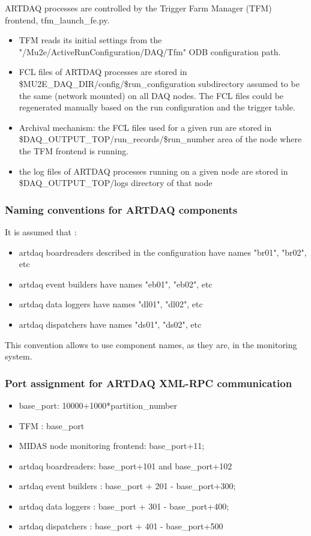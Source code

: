 ARTDAQ processes are controlled by the Trigger Farm Manager (TFM) frontend,
tfm\_launch\_fe.py.

\begin{itemize}
\item 
  TFM reads its initial settings from the "/Mu2e/ActiveRunConfiguration/DAQ/Tfm"
  ODB configuration path.
\item
  FCL files of ARTDAQ processes are stored in \$MU2E\_DAQ\_DIR/config/\$run\_configuration
  subdirectory assumed to be the same (network mounted) on all DAQ nodes.
  The FCL files could be regenerated manually based on the run configuration and the trigger table.
\item
  Archival mechanism: the FCL files used for a given run are stored
  in \$DAQ\_OUTPUT\_TOP/run\_records/\$run\_number area of the node where the TFM frontend is running.
\item
  the log files of ARTDAQ processes running on a given node are stored in \$DAQ\_OUTPUT\_TOP/logs
  directory of that node
\end{itemize}

\subsubsection{Naming conventions for ARTDAQ components}

It is assumed that :
\begin{itemize}
\item 
  artdaq boardreaders described in the configuration have names "br01", "br02", etc
\item 
  artdaq event builders have names "eb01", "eb02", etc
\item 
  artdaq data loggers have names "dl01", "dl02", etc
\item 
  artdaq dispatchers have names "ds01", "ds02", etc
\end{itemize}

This convention allows to use component names, as they are, in the monitoring system.

\subsubsection{Port assignment for ARTDAQ XML-RPC communication}
\begin{itemize}
\item
  base\_port: 10000+1000*partition\_number
\item 
  TFM : base\_port
\item 
  MIDAS node monitoring frontend: base\_port+11;
\item 
  artdaq boardreaders: base\_port+101 and base\_port+102
\item 
  artdaq event builders : base\_port + 201 - base\_port+300;
\item 
  artdaq data loggers  : base\_port + 301 - base\_port+400;
\item 
  artdaq dispatchers : base\_port + 401 - base\_port+500
\end{itemize}


